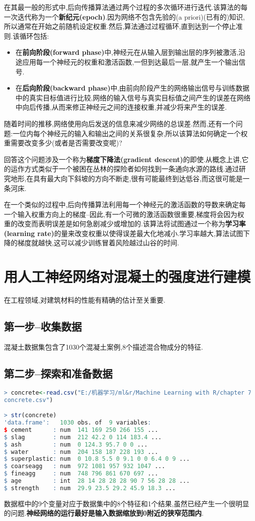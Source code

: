 \documentclass[11pt,a4paper,oneside]{book}
\begin{document}
在其最一般的形式中,后向传播算法通过两个过程的多次循环进行迭代.该算法的每一次迭代称为一个\textbf{新纪元(epoch)}.因为网络不包含先验的(a priori)(已有的)知识,所以通常在开始之前随机设定权重.然后,算法通过过程循环,直到达到一个停止准则.该循环包括:
\begin{itemize}
	\item 在\textbf{前向阶段(forward phase)}中,神经元在从输入层到输出层的序列被激活,沿途应用每一个神经元的权重和激活函数,一但到达最后一层,就产生一个输出信号.
	\item 在\textbf{后向阶段(backward phase)}中,由前向阶段产生的网络输出信号与训练数据中的真实目标值进行比较,网络的输入信号与真实目标值之间产生的误差在网络中向后传播,从而来修正神经元之间的连接权重,并减少将来产生的误差.
\end{itemize}

随着时间的推移,网络使用向后发送的信息来减少网络的总误差.然而,还有一个问题:一位内每个神经元的输入和输出之间的关系很复杂,所以该算法如何确定一个权重需要改变多少(或者是否需要改变呢)?

回答这个问题涉及一个称为\textbf{梯度下降法(gradient descent)}的即使.从概念上讲,它的运作方式类似于一个被困在丛林的探险者如何找到一条通向水源的路线.通过研究地形,在具有最大向下斜坡的方向不断走,很有可能最终到达低谷,而这很可能是一条河床.

在一个类似的过程中,后向传播算法利用每一个神经元的激活函数的导数来确定每一个输入权重方向上的梯度--因此,有一个可微的激活函数很重要,梯度将会因为权重的改变而表明误差是如何急剧减少或增加的.该算法将试图通过一个称为\textbf{学习率(learning rate)}的量来改变权重以使得误差最大化地减小.学习率越大,算法试图下降的梯度就越快,这可以减少训练冒着风险越过山谷的时间.

\section{用人工神经网络对混凝土的强度进行建模}
在工程领域,对建筑材料的性能有精确的估计至关重要.
\subsection{第一步--收集数据}
混凝土数据集包含了1030个混凝土案例,8个描述混合物成分的特征.
\subsection{第二步--探索和准备数据}
\begin{lstlisting}[language=r]
> concrete<-read.csv("E:/机器学习/ml&r/Machine Learning with R/chapter 7/
concrete.csv")

> str(concrete)
'data.frame':	1030 obs. of  9 variables:
$ cement      : num  141 169 250 266 155 ...
$ slag        : num  212 42.2 0 114 183.4 ...
$ ash         : num  0 124.3 95.7 0 0 ...
$ water       : num  204 158 187 228 193 ...
$ superplastic: num  0 10.8 5.5 0 9.1 0 0 6.4 0 9 ...
$ coarseagg   : num  972 1081 957 932 1047 ...
$ fineagg     : num  748 796 861 670 697 ...
$ age         : int  28 14 28 28 28 90 7 56 28 28 ...
$ strength    : num  29.9 23.5 29.2 45.9 18.3 ...
\end{lstlisting}
数据框中的9个变量对应于数据集中的8个特征和1个结果,虽然已经产生一个很明显的问题.\textbf{神经网络的运行最好是输入数据缩放到0附近的狭窄范围内}.
\end{document}
